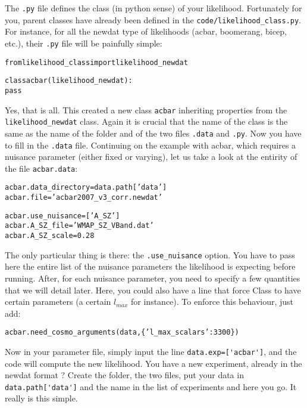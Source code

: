 \documentclass[10pt]{article}
\begin{document}
  The \verb?.py? file defines the class (in python sense) of your likelihood.
  Fortunately for you, parent classes have already been defined in the
  \verb?code/likelihood_class.py?. For instance, for all the newdat type of
  likelihoods (acbar, boomerang, bicep, etc.), their \verb?.py? file will be
  painfully simple:

  \begin{alltt}
  from likelihood_class import likelihood_newdat

  class acbar(likelihood_newdat):
    pass
  \end{alltt}

  Yes, that is all. This created a new class \verb?acbar? inheriting properties from the \verb?likelihood_newdat? class. Again it is crucial that the name of the class is the same as the name of the folder and of the two files {\tt .data} and {\tt.py}.
    Now you have to fill in the \verb?.data? file. Continuing
  on the example with acbar, which requires a nuisance parameter (either fixed
  or varying), let us take a look at the entirity of the file
  \verb?acbar.data?:
  
  \begin{alltt}
    acbar.data_directory = data.path['data']
    acbar.file           = 'acbar2007_v3_corr.newdat'

    acbar.use_nuisance   = ['A_SZ']
    acbar.A_SZ_file      = 'WMAP_SZ_VBand.dat'
    acbar.A_SZ_scale     = 0.28
  \end{alltt}

  The only particular thing is there: the \verb?.use_nuisance? option. You have
  to pass here the entire list of the nuisance parameters the likelihood is
  expecting before running. After, for each nuisance parameter, you need to
  specify a few quantities that we will detail later.  Here, you could also have a line that
  force Class to have certain parameters (a certain $l_{max}$ for instance). To
  enforce this behaviour, just add:
  \begin{alltt}
    acbar.need_cosmo_arguments(data,\{'l_max_scalars':3300\})
  \end{alltt}

  Now in your parameter file, simply input the line \verb?data.exp=['acbar']?,
  and the code will compute the new likelihood. You have a new experiment,
  already in the newdat format ? Create the folder, the two files, put your
  data in \verb?data.path['data']? and the name in the list of experiments and
  here you go. It really is this simple.
  
\end{document}
